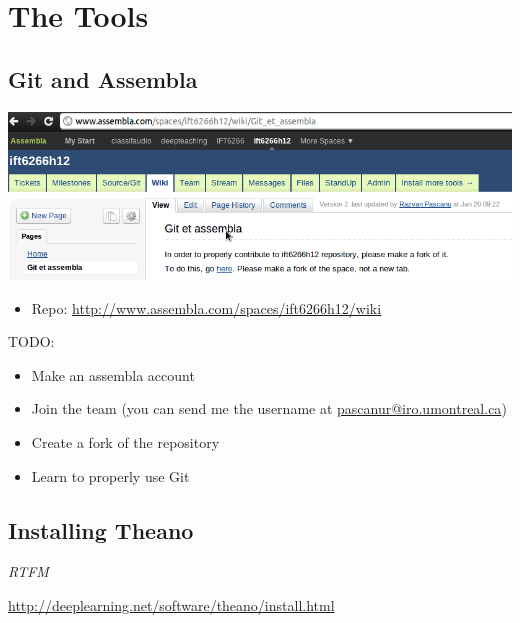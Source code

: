 \documentclass[9pt]{beamer}
\begin{document}
\begin{frame}
\begin{columns}[b]
    \end{columns}
\end{frame}

\section{The Tools}
\subsection{Git and Assembla}
\begin{frame}
        \includegraphics[width=.8\textwidth]{pics/assembla.png} 
    \begin{itemize}
        \item Repo: \url{http://www.assembla.com/spaces/ift6266h12/wiki}
    \end{itemize}
    {\color{darkred}TODO}:
    \begin{itemize}
        \item Make an assembla account
        \item Join the team (you can send me the username at \url{pascanur@iro.umontreal.ca})
        \item Create a fork of the repository
        \item Learn to properly use {\color{darkred} Git}
    \end{itemize}
\end{frame}

\subsection{Installing Theano}
\begin{frame}
    \begin{center}
    {\Huge \emph{RTFM}}
    \end{center}

    \url{http://deeplearning.net/software/theano/install.html}
\end{frame}
\end{document}

